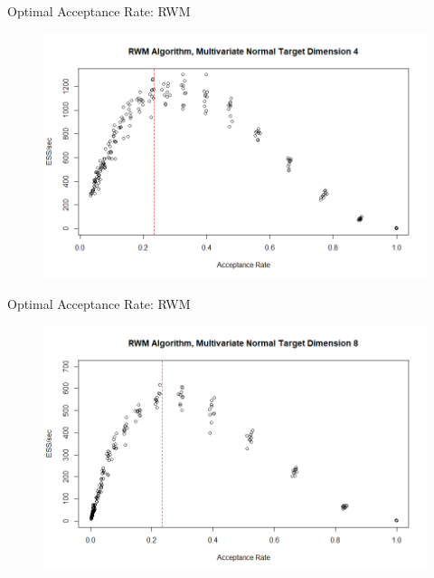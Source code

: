 \documentclass{beamer}
\begin{document}

\begin{frame}{Optimal Acceptance Rate: RWM}
\begin{figure}
\centering
\includegraphics[scale = 0.4]{RWM_Optimal4.png}
\end{figure}
\end{frame}


\begin{frame}{Optimal Acceptance Rate: RWM}
\begin{figure}
\centering
\includegraphics[scale = 0.4]{RWM_Optimal8.png}
\end{figure}
\end{frame}

\end{document}
